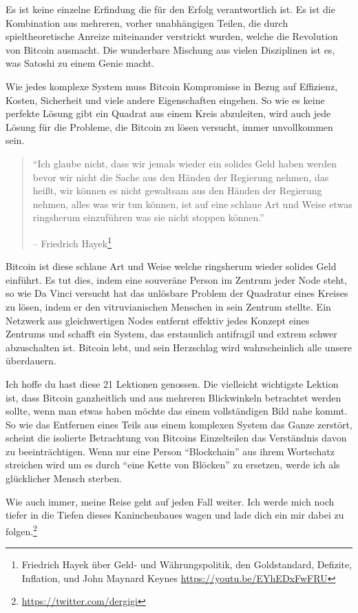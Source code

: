 Es ist keine einzelne Erfindung die für den Erfolg verantwortlich ist. Es ist
die Kombination aus mehreren, vorher unabhängigen Teilen, die durch
spieltheoretische Anreize miteinander verstrickt wurden, welche die Revolution
von Bitcoin ausmacht. Die wunderbare Mischung aus vielen Disziplinen ist es, was
Satoshi zu einem Genie macht.

Wie jedes komplexe System muss Bitcoin Kompromisse in Bezug auf
Effizienz, Kosten, Sicherheit und viele andere Eigenschaften eingehen. So wie es
keine perfekte Lösung gibt ein Quadrat aus einem Kreis abzuleiten, wird auch
jede Lösung für die Probleme, die Bitcoin zu lösen versucht, immer unvollkommen
sein.

\begin{quotation}\begin{samepage}
\enquote{Ich glaube nicht, dass wir jemals wieder ein solides Geld haben werden
bevor wir nicht die Sache aus den Händen der Regierung nehmen, das heißt, wir
können es nicht gewaltsam aus den Händen der Regierung nehmen, alles was wir tun
können, ist auf eine schlaue Art und Weise etwas ringsherum einzuführen was sie
nicht stoppen können.}
\begin{flushright} -- Friedrich Hayek\footnote{Friedrich Hayek über Geld- und
Währungspolitik, den Goldstandard, Defizite, Inflation, und John Maynard Keynes
\url{https://youtu.be/EYhEDxFwFRU}}
\end{flushright}\end{samepage}\end{quotation}

Bitcoin ist diese schlaue Art und Weise welche ringsherum wieder solides Geld
einführt. Es tut dies, indem eine souveräne Person im Zentrum jeder Node steht,
so wie Da Vinci versucht hat das unlösbare Problem der Quadratur eines Kreises
zu lösen, indem er den vitruvianischen Menschen in sein Zentrum stellte. Ein
Netzwerk aus gleichwertigen Nodes entfernt effektiv jedes Konzept eines Zentrums
und schafft ein System, das erstaunlich antifragil und extrem schwer abzuschalten
ist. Bitcoin lebt, und sein Herzschlag wird wahrscheinlich alle unsere
überdauern.

Ich hoffe du hast diese 21 Lektionen genossen. Die vielleicht wichtigste Lektion
ist, dass Bitcoin ganzheitlich und aus mehreren Blickwinkeln betrachtet werden
sollte, wenn man etwas haben möchte das einem vollständigen Bild nahe kommt. So
wie das Entfernen eines Teils aus einem komplexen System das Ganze zerstört,
scheint die isolierte Betrachtung von Bitcoins Einzelteilen das Verständnis
davon zu beeinträchtigen. Wenn nur eine Person \enquote{Blockchain} aus ihrem
Wortschatz streichen wird um es durch \enquote{eine Kette von Blöcken} zu
ersetzen, werde ich als glücklicher Mensch sterben.

Wie auch immer, meine Reise geht auf jeden Fall weiter. Ich werde mich noch
tiefer in die Tiefen dieses Kaninchenbaues wagen und lade dich ein mir dabei zu
folgen.\footnote{\url{https://twitter.com/dergigi}}

%
